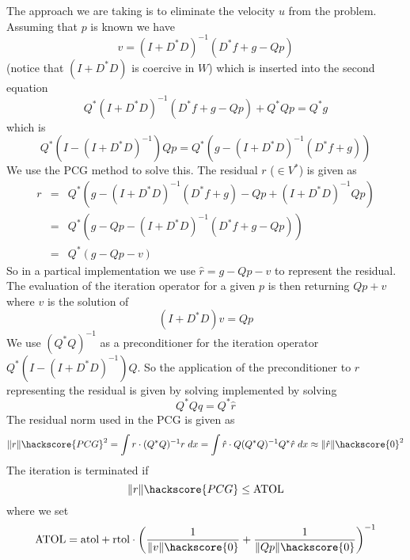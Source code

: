 The approach we are taking is to eliminate the velocity $u$ from the problem. Assuming that $p$ is known we have
\begin{equation}\label{DARCY V FORM}
v= (I+D^*D)^{-1} (D^*f + g - Qp)
\end{equation} 
(notice that $(I+D^*D)$ is coercive in $W$) which is inserted into the second equation
\begin{equation}
Q^* (I+D^*D)^{-1} (D^*f + g - Qp) + Q^* Q p = Q^*g 
\end{equation} 
which is 
\begin{equation}
Q^* ( I - (I+D^*D)^{-1} ) Q p = Q^* (g-(I+D^*D)^{-1} (D^*f + g) ) 
\end{equation} 
We use the PCG  method to solve this. The residual $r$ ($\in V^*$) is given as
\begin{equation}
\begin{array}{rcl}
r & = & Q^*  \left( g -(I+D^*D)^{-1} (D^*f + g) - Qp + (I+D^*D)^{-1}Q p \right)\\
& =&  Q^* \left( g- Qp - (I+D^*D)^{-1} (D^*f + g - Qp) \right) \\
& =&  Q^* \left( g - Qp - v \right)
\end{array}
\end{equation} 
So in a partical implementation we use $\hat{r}=g-Qp-v$ to represent the residual. 
The evaluation of the iteration operator for a given $p$ is then 
returning $Qp+v$ where $v$ is the solution of 
\begin{equation}\label{UPDATE W}
(I+D^*D)v = Qp
\end{equation}
We use $(Q^*Q)^{-1}$ as a preconditioner for the iteration operator $Q^* ( I - (I+D^*D)^{-1} ) Q$. So the application of the preconditioner to $\hat{r}$ representing the residual is given by solving
implemented by solving 
\begin{equation}\label{UPDATE P}
Q^*Q q  = Q^*\hat{r}
\end{equation}
The residual norm used in the PCG is given as
\begin{equation}\label{DARCY R NORM}
\|r\|\hackscore{PCG}^2 = \int r \cdot (Q^*Q)^{-1} r \; dx =\int \hat{r} \cdot Q (Q^*Q)^{-1} Q^* \hat{r} \; dx \approx
\|\hat{r}\|\hackscore{0}^2
\end{equation}
The iteration is terminated if 
\begin{equation}\label{DARCY STOP}
\|r\|\hackscore{PCG} \le \mbox{ATOL}
\end{equation}
where we set 
\begin{equation}\label{DARCY ATOL DEF}
\mbox{ATOL} = \mbox{atol} + \mbox{rtol} \cdot \left(\frac{1}{\|v\|\hackscore{0}} + \frac{1}{\|Qp\|\hackscore{0}} \right)^{-1} 
\end{equation}
